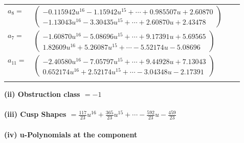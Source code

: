 \documentclass[1p]{elsarticle_modified}
\theoremstyle{definition}
\begin{document}
\begin{tabular}{m{7pt} m{180pt} m{7pt} m{180pt} }
\flushright $a_{8}=$&$\begin{pmatrix}-0.115942 u^{16}-1.15942 u^{15}+\cdots+0.985507 u+2.60870\\-1.13043 u^{16}-3.30435 u^{15}+\cdots+2.60870 u+2.43478\end{pmatrix}$ \\
\flushright $a_{7}=$&$\begin{pmatrix}-1.60870 u^{16}-5.08696 u^{15}+\cdots+9.17391 u+5.69565\\1.82609 u^{16}+5.26087 u^{15}+\cdots-5.52174 u-5.08696\end{pmatrix}$ \\
\flushright $a_{11}=$&$\begin{pmatrix}-2.40580 u^{16}-7.05797 u^{15}+\cdots+9.44928 u+7.13043\\0.652174 u^{16}+2.52174 u^{15}+\cdots-3.04348 u-2.17391\end{pmatrix}$\\&\end{tabular}
\flushleft \textbf{(ii) Obstruction class $= -1$}\\~\\
\flushleft \textbf{(iii) Cusp Shapes $= \frac{117}{23} u^{16}+\frac{365}{23} u^{15}+\cdots-\frac{592}{23} u-\frac{459}{23}$}\\~\\
\newpage\renewcommand{\arraystretch}{1}
\flushleft \textbf{(iv) u-Polynomials at the component}\newline \\
\end{document}
